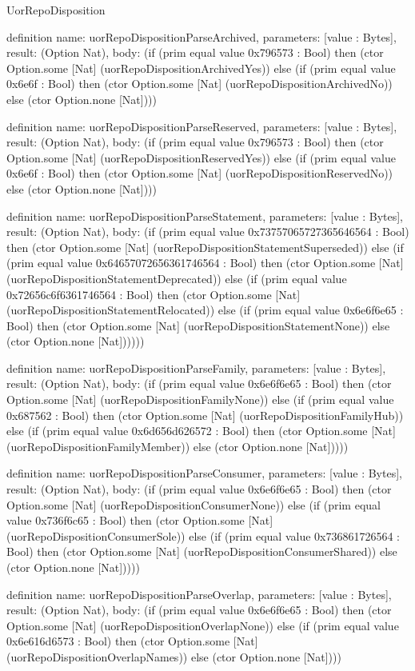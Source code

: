 \begin{lexlean}{UorRepoDisposition}
\begin{semanticmodule}
definition{
  name: uorRepoDispositionParseArchived,
  parameters: [value : Bytes],
  result: (Option Nat),
  body: (if (prim equal value 0x796573 : Bool) then (ctor Option.some [Nat] (uorRepoDispositionArchivedYes)) else (if (prim equal value 0x6e6f : Bool) then (ctor Option.some [Nat] (uorRepoDispositionArchivedNo)) else (ctor Option.none [Nat])))
}

definition{
  name: uorRepoDispositionParseReserved,
  parameters: [value : Bytes],
  result: (Option Nat),
  body: (if (prim equal value 0x796573 : Bool) then (ctor Option.some [Nat] (uorRepoDispositionReservedYes)) else (if (prim equal value 0x6e6f : Bool) then (ctor Option.some [Nat] (uorRepoDispositionReservedNo)) else (ctor Option.none [Nat])))
}

definition{
  name: uorRepoDispositionParseStatement,
  parameters: [value : Bytes],
  result: (Option Nat),
  body: (if (prim equal value 0x73757065727365646564 : Bool) then (ctor Option.some [Nat] (uorRepoDispositionStatementSuperseded)) else (if (prim equal value 0x64657072656361746564 : Bool) then (ctor Option.some [Nat] (uorRepoDispositionStatementDeprecated)) else (if (prim equal value 0x72656c6f6361746564 : Bool) then (ctor Option.some [Nat] (uorRepoDispositionStatementRelocated)) else (if (prim equal value 0x6e6f6e65 : Bool) then (ctor Option.some [Nat] (uorRepoDispositionStatementNone)) else (ctor Option.none [Nat])))))
}

definition{
  name: uorRepoDispositionParseFamily,
  parameters: [value : Bytes],
  result: (Option Nat),
  body: (if (prim equal value 0x6e6f6e65 : Bool) then (ctor Option.some [Nat] (uorRepoDispositionFamilyNone)) else (if (prim equal value 0x687562 : Bool) then (ctor Option.some [Nat] (uorRepoDispositionFamilyHub)) else (if (prim equal value 0x6d656d626572 : Bool) then (ctor Option.some [Nat] (uorRepoDispositionFamilyMember)) else (ctor Option.none [Nat]))))
}

definition{
  name: uorRepoDispositionParseConsumer,
  parameters: [value : Bytes],
  result: (Option Nat),
  body: (if (prim equal value 0x6e6f6e65 : Bool) then (ctor Option.some [Nat] (uorRepoDispositionConsumerNone)) else (if (prim equal value 0x736f6c65 : Bool) then (ctor Option.some [Nat] (uorRepoDispositionConsumerSole)) else (if (prim equal value 0x736861726564 : Bool) then (ctor Option.some [Nat] (uorRepoDispositionConsumerShared)) else (ctor Option.none [Nat]))))
}

definition{
  name: uorRepoDispositionParseOverlap,
  parameters: [value : Bytes],
  result: (Option Nat),
  body: (if (prim equal value 0x6e6f6e65 : Bool) then (ctor Option.some [Nat] (uorRepoDispositionOverlapNone)) else (if (prim equal value 0x6e616d6573 : Bool) then (ctor Option.some [Nat] (uorRepoDispositionOverlapNames)) else (ctor Option.none [Nat])))
}


\end{semanticmodule}
\end{lexlean}
